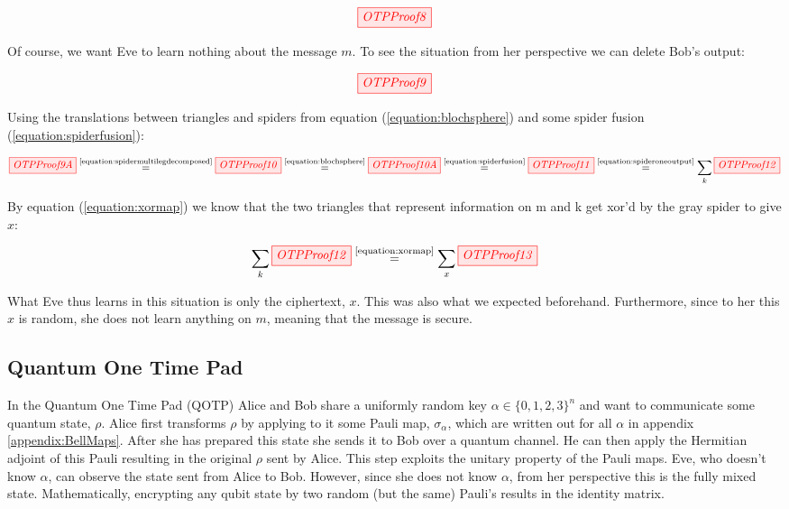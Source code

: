 \documentclass[]{article}
\newcommand{\equaltext}[1]{\ensuremath{\stackrel{\text{#1}}{=}}}
\begin{document}
\begin{equation}
	\tikzfig{OTPProof8}
\end{equation}

Of course, we want Eve to learn nothing about the message $m$. To see the situation from her perspective we can delete Bob's output:

\begin{equation}
	\tikzfig{OTPProof9}
\end{equation}

Using the translations between triangles and spiders from equation (\ref{equation:blochsphere}) and some spider fusion (\ref{equation:spiderfusion}):

\begin{equation}
\tikzfig{OTPProof9A} \equaltext{\ref{equation:spidermultilegdecomposed}} \tikzfig{OTPProof10} \equaltext{\ref{equation:blochsphere}} \tikzfig{OTPProof10A} \equaltext{\ref{equation:spiderfusion}} \tikzfig{OTPProof11} \equaltext{\ref{equation:spideroneoutput}} \sum\limits_{k} \tikzfig{OTPProof12}
\end{equation}

By equation (\ref{equation:xormap}) we know that the two triangles that represent information on m and k get xor'd by the gray spider to give $x$:

\begin{equation}
\sum\limits_{k} \tikzfig{OTPProof12} \equaltext{\ref{equation:xormap}} \sum\limits_{x} \tikzfig{OTPProof13}
\end{equation}

What Eve thus learns in this situation is only the ciphertext, $x$. This was also what we expected beforehand. Furthermore, since to her this $x$ is random, she does not learn anything on $m$, meaning that the message is secure.

\subsection{Quantum One Time Pad}
\label{QOTP}
In the Quantum One Time Pad (QOTP) Alice and Bob share a uniformly random key $ \alpha \in \{0,1,2,3\}^n$ and want to communicate some quantum state, $\rho$. Alice first transforms $\rho$ by applying to it some Pauli map, $\sigma_\alpha$, which are written out for all $\alpha$ in appendix \ref{appendix:BellMaps}. After she has prepared this state she sends it to Bob over a quantum channel. He can then apply the Hermitian adjoint of this Pauli resulting in the original $\rho$ sent by Alice. This step exploits the unitary property of the Pauli maps. Eve, who doesn't know $\alpha$, can observe the state sent from Alice to Bob. However, since she does not know $\alpha$, from her perspective this is the fully mixed state. Mathematically, encrypting any qubit state by two random (but the same) Pauli's results in the identity matrix.
\end{document}
